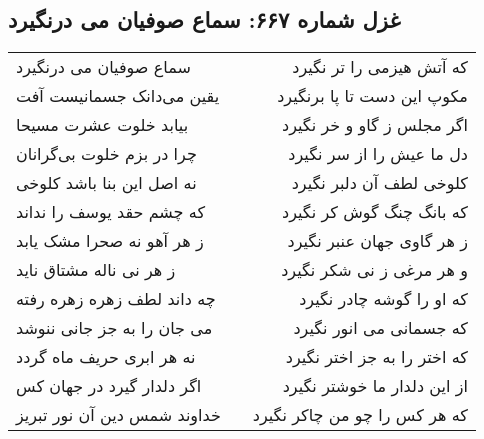 \begin{center}
\section*{غزل شماره ۶۶۷: سماع صوفیان می درنگیرد}
\label{sec:0667}
\begin{longtable}{l p{0.5cm} r}
سماع صوفیان می درنگیرد
&&
که آتش هیزمی را تر نگیرد
\\
یقین می‌دانک جسمانیست آفت
&&
مکوپ این دست تا پا برنگیرد
\\
بیابد خلوت عشرت مسیحا
&&
اگر مجلس ز گاو و خر نگیرد
\\
چرا در بزم خلوت بی‌گرانان
&&
دل ما عیش را از سر نگیرد
\\
نه اصل این بنا باشد کلوخی
&&
کلوخی لطف آن دلبر نگیرد
\\
که چشم حقد یوسف را نداند
&&
که بانگ چنگ گوش کر نگیرد
\\
ز هر آهو نه صحرا مشک یابد
&&
ز هر گاوی جهان عنبر نگیرد
\\
ز هر نی ناله مشتاق ناید
&&
و هر مرغی ز نی شکر نگیرد
\\
چه داند لطف زهره زهره رفته
&&
که او را گوشه چادر نگیرد
\\
می جان را به جز جانی ننوشد
&&
که جسمانی می انور نگیرد
\\
نه هر ابری حریف ماه گردد
&&
که اختر را به جز اختر نگیرد
\\
اگر دلدار گیرد در جهان کس
&&
از این دلدار ما خوشتر نگیرد
\\
خداوند شمس دین آن نور تبریز
&&
که هر کس را چو من چاکر نگیرد
\\
\end{longtable}
\end{center}
